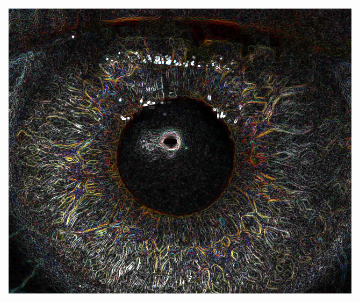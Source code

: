 \documentclass{article}
\begin{document}
\begin{figure}[H]
\begin{subfigure}{.09\textwidth}
  \label{fig:arrow}
\end{subfigure}%
\begin{subfigure}{.47\textwidth}
  \centering
  \includegraphics[width=0.97\linewidth]{_Figures/raw_data_3_sobel.png}
  \caption{}
  \label{fig:special}
\end{subfigure}



\end{figure}
\end{document}
